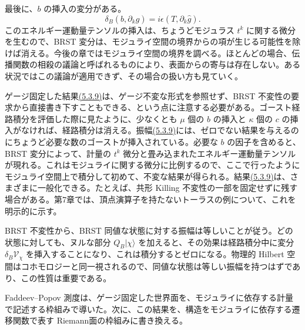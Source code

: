最後に、$b$ の挿入の変分がある。
\begin{equation}
\delta_B(b,\partial_k\hat g)=i\epsilon(T,\partial_k\hat g).
\tag{5.4.6}\label{eq:5.4.6}
\end{equation}
このエネルギー運動量テンソルの挿入は、ちょうどモジュラス $t^k$ に関する微分を生むので、BRST 変分は、モジュライ空間の境界からの項が生じる可能性を除けば消える。今後の章ではモジュライ空間の境界を調べる。ほとんどの場合、伝播関数の相殺の議論と呼ばれるものにより、表面からの寄与は存在しない。ある状況ではこの議論が適用できず、その場合の扱い方も見ていく。

ゲージ固定した結果\hyperref[eq:5.3.9]{(5.3.9)}は、ゲージ不変な形式を参照せず、BRST 不変性の要求から直接書き下すこともできる、という点に注意する必要がある。ゴースト経路積分を評価した際に見たように、少なくとも $\mu$ 個の $b$ の挿入と $\kappa$ 個の $c$ の挿入がなければ、経路積分は消える。振幅\hyperref[eq:5.3.9]{(5.3.9)}には、ゼロでない結果を与えるのにちょうど必要な数のゴーストが挿入されている。必要な $b$ の因子を含めると、BRST 変分によって、計量の $t^k$ 微分と畳み込まれたエネルギー運動量テンソルが現れる。これはモジュライに関する微分に比例するので、ここで行ったようにモジュライ空間上で積分して初めて、不変な結果が得られる。結果\hyperref[eq:5.3.9]{(5.3.9)}は、さまざまに一般化できる。たとえば、共形 Killing 不変性の一部を固定せずに残す場合がある。第7章では、頂点演算子を持たないトーラスの例について、これを明示的に示す。

BRST 不変性から、BRST 同値な状態に対する振幅は等しいことが従う。どの状態に対しても、ヌルな部分 $Q_B\lvert\chi\rangle$ を加えると、その効果は経路積分中に変分 $\delta_B\mathcal V_\chi$ を挿入することになり、これは積分するとゼロになる。物理的 Hilbert 空間はコホモロジーと同一視されるので、同値な状態は等しい振幅を持つはずであり、この性質は重要である。


Faddeev--Popov 測度は、ゲージ固定した世界面を、モジュライに依存する計量で記述する枠組みで導いた。次に、この結果を、構造をモジュライに依存する遷移関数で表す Riemann面の枠組みに書き換える。

